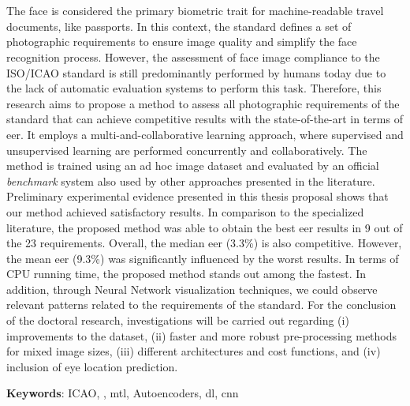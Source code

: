 \section*{}

The face is considered the primary biometric trait for machine-readable travel documents, like passports. In this context, the \icao standard defines a set of photographic requirements to ensure image quality and simplify the face recognition process. However, the assessment of face image compliance to the ISO/ICAO standard is still predominantly performed by humans today due to the lack of automatic evaluation systems to perform this task. Therefore, this research aims to propose a method to assess all photographic requirements of the \icao standard that can achieve competitive results with the state-of-the-art in terms of \acf{eer}. It employs a multi-and-collaborative learning approach, where supervised and unsupervised learning are performed concurrently and collaboratively. The method is trained using an ad hoc image dataset and evaluated by an official \textit{benchmark} system also used by other approaches presented in the literature. Preliminary experimental evidence presented in this thesis proposal shows that our method achieved satisfactory results. In comparison to the specialized literature, the proposed method was able to obtain the best \acs{eer} results in 9 out of the 23 requirements. Overall, the median \acs{eer} (3.3\%) is also competitive. However, the mean \acs{eer} (9.3\%) was significantly influenced by the worst results. In terms of CPU running time, the proposed method stands out among the fastest. In addition, through Neural Network visualization techniques, we could observe relevant patterns related to the requirements of the \icao standard. For the conclusion of the doctoral research, investigations will be carried out regarding (i) improvements to the dataset, (ii) faster and more robust pre-processing methods for mixed image sizes, (iii) different architectures and cost functions, and (iv) inclusion of eye location prediction.

\vspace{2em}

\noindent
\textbf{Keywords}: ICAO, \icao, \acl{mtl}, Autoencoders, \acl{dl}, \acl{cnn}

\newpage
